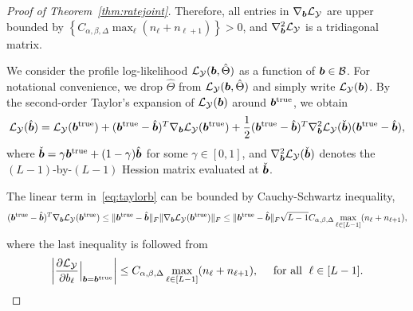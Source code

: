 \documentclass[11pt]{article}
\theoremstyle{plain}
\theoremstyle{definition}
\providecommand{\DIFaddtex}[1]{{\protect\color{blue}\uwave{#1}}} %
\providecommand{\DIFdeltex}[1]{{\protect\color{red}\sout{#1}}}                      %
\providecommand{\DIFaddbegin}{} %
\providecommand{\DIFaddend}{} %
\providecommand{\DIFdelbegin}{} %
\providecommand{\DIFdelend}{} %
\providecommand{\DIFadd}[1]{\texorpdfstring{\DIFaddtex{#1}}{#1}} %
\providecommand{\DIFdel}[1]{\texorpdfstring{\DIFdeltex{#1}}{}} %
\begin{document}
\begin{proof}[Proof of Theorem~\ref{thm:ratejoint}]
Therefore, all entries in $\nabla_{\bm{b}}\mathcal{L}_{\mathcal{Y}}$ are upper bounded by $\left\{C_{\alpha,\beta,\Delta} \max_\ell (n_\ell+n_{\ell+1})\right\}>0$, and $\nabla^2_{\bm{b}}\mathcal{L}_{\mathcal{Y}}$ is a tridiagonal matrix.

We consider the profile log-likelihood \DIFdelbegin \DIFdel{$\mathcal{L}_{\mathcal{Y}}(\bm{b}, \hat \Theta)$ }\DIFdelend \DIFaddbegin \DIFadd{$\flogl(\hat \Theta,\mb)$ }\DIFaddend as a function of $\bm{b}\in\mathcal{B}$. For notational convenience, we drop $\hat \Theta$ from \DIFdelbegin \DIFdel{$\mathcal{L}_{\mathcal{Y}}(\bm{b}, \hat \Theta)$ }\DIFdelend \DIFaddbegin \DIFadd{$\flogl(\hat \Theta,\mb)$ }\DIFaddend and simply write $\mathcal{L}_{\mathcal{Y}}(\bm{b})$. By the second-order Taylor's expansion of $\mathcal{L}_{\mathcal{Y}}(\bm{b})$ around $\bm{b}^{\text{true}}$, we obtain
\begin{equation}\label{eq:taylorb}
\mathcal{L}_{\mathcal{Y}}(\hat{\bm{b}})=\mathcal{L}_{\mathcal{Y}}(\bm{b}^{\text{true}})+(\bm{b}^{\text{true}}-\hat{\bm{b}})^T\nabla_{\bm{b}}\mathcal{L}_{\mathcal{Y}}(\bm{b}^{\text{true}})+ {1\over 2}(\bm{b}^{\text{true}}-\hat{\bm{b}})^T\nabla^2_{\bm{b}}\mathcal{L}_{\mathcal{Y}}(\check{\bm{b}})(\bm{b}^{\text{true}}-\hat{\bm{b}}),
\end{equation}
where $\check{\bm{b}}=\gamma\bm{b}^{\text{true}}+(1-\gamma)\hat{\bm{b}}$ for some $\gamma\in[0,1]$, and $\nabla^2_{\bm{b}}\mathcal{L}_{\mathcal{Y}}(\check{\bm{b}})$ denotes the $(L-1)$-by-$(L-1)$ Hession matrix evaluated at $\check{\bm{b}}$.

The linear term in~\eqref{eq:taylorb} can be bounded by Cauchy-Schwartz inequality,
\begin{equation}\label{eq:linearb}
(\bm{b}^{\text{true}}-\hat{\bm{b}})^T\nabla_{\bm{b}}\mathcal{L}_{\mathcal{Y}}(\bm{b}^{\text{true}})\leq \lVert\bm{b}^{\text{true}}-\hat{\bm{b}}\rVert_F\lVert\nabla_{\bm{b}}\mathcal{L}_{\mathcal{Y}}(\bm{b}^{\text{true}})\rVert_F
\leq \lVert\bm{b}^{\text{true}}-\hat{\bm{b}}\rVert_F\sqrt{L-1}C_{\alpha,\beta,\Delta}\max_{\ell\in[L-1]}(n_\ell+n_{\ell+1}),
\end{equation}
where the last inequality is followed from
\[
\left|{\partial \mathcal{L}_{\mathcal{Y}}\over \partial b_\ell}\Big|_{\bm{b}=\bm{b}^{\text{true}}}\right| \leq C_{\alpha,\beta,\Delta}\max_{\ell\in[L-1]}(n_{\ell}+n_{\ell+1}), \quad \textrm{ for all } \; \ell\in [L-1].
\]


\end{proof}
\end{document}
